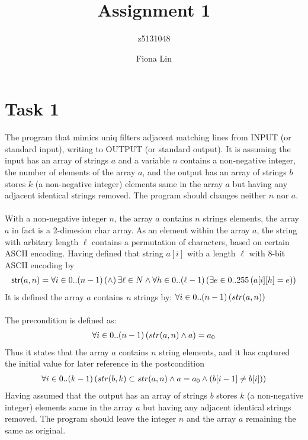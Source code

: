 \documentclass[a4paper,12pt,fleqn]{scrartcl}
\title{Assignment 1}
\author{z5131048\and Fiona Lin}
\newcommand{\str}{\mathsf{str}}
\begin{document}
\maketitle
\section{Task 1}
\label{sec:task-1}

The program that mimics uniq filters adjacent matching lines from INPUT (or standard input), writing to OUTPUT (or standard output). It is assuming the input has an array of strings $a$ and a variable $n$ contains a non-negative integer, the number of elements of the array $a$, and the output has an array of strings $b$ stores $k$ (a non-negative integer) elements same in the array $a$ but having any adjacent identical strings removed. The program should changes neither $n$ nor $a$. \\
\\
With a non-negative integer $n$, the array $a$ contains $n$ strings elements, the array $a$ in fact is a 2-dimesion char array. As an element within the array $a$, the string with arbitary length $\ell$ contains a permutation of characters, based on certain ASCII encoding. Having defined that string $a[i]$ with a length $\ell$ with 8-bit ASCII encoding by\\
\begin{gather*}
	\str(a,n) = \All{i\in 0..(n-1)} \AND {\exists \ell\in N} \And \All{h\in 0..(\ell-1)}{\Exi{e\in 0..255}{a[i][h]=e}}
\end{gather*}
It is defined the array $a$ contains $n$ strings by: \quad $\forall i\in 0..(n-1)\left(str(a,n)\right)$\\
\\
The precondition is defined as:
\begin{gather*}
	\forall i\in 0..(n-1)\left(str(a,n)\wedge a\right)=a_0
\end{gather*}
Thus it states that the array $a$ contains $n$ string elements, and it has captured the initial value for later reference in the postcondition
\begin{gather*}
\forall i\in 0..(k-1)\left(str(b,k) \subset str(a,n) \wedge a = a_0 \wedge (b[i-1] \neq b[i])\right)
\end{gather*}
Having assumed that the output has an array of strings $b$ stores $k$ (a non-negative integer) elements same in the array $a$ but having any adjacent identical strings removed. The program should leave the integer $n$ and the array $a$ remaining the same as original.
\\
\end{document}

